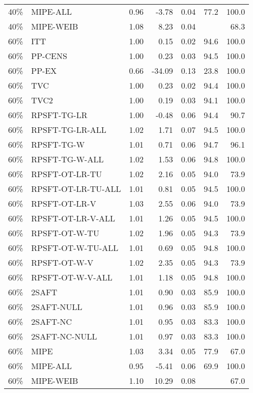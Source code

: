 \begin{table}[ht]
{\begin{tabular}{llrrrrr}
  40\% & MIPE-ALL & 0.96 & -3.78 & 0.04 & 77.2 & 100.0 \\ 
  40\% & MIPE-WEIB & 1.08 & 8.23 & 0.04 &  & 68.3 \\ 
   \hline
60\% & ITT & 1.00 & 0.15 & 0.02 & 94.6 & 100.0 \\ 
  60\% & PP-CENS & 1.00 & 0.23 & 0.03 & 94.5 & 100.0 \\ 
  60\% & PP-EX & 0.66 & -34.09 & 0.13 & 23.8 & 100.0 \\ 
  60\% & TVC & 1.00 & 0.23 & 0.02 & 94.4 & 100.0 \\ 
  60\% & TVC2 & 1.00 & 0.19 & 0.03 & 94.1 & 100.0 \\ 
   \hline
60\% & RPSFT-TG-LR & 1.00 & -0.48 & 0.06 & 94.4 & 90.7 \\ 
  60\% & RPSFT-TG-LR-ALL & 1.02 & 1.71 & 0.07 & 94.5 & 100.0 \\ 
  60\% & RPSFT-TG-W & 1.01 & 0.71 & 0.06 & 94.7 & 96.1 \\ 
  60\% & RPSFT-TG-W-ALL & 1.02 & 1.53 & 0.06 & 94.8 & 100.0 \\ 
  60\% & RPSFT-OT-LR-TU & 1.02 & 2.16 & 0.05 & 94.0 & 73.9 \\ 
  60\% & RPSFT-OT-LR-TU-ALL & 1.01 & 0.81 & 0.05 & 94.5 & 100.0 \\ 
  60\% & RPSFT-OT-LR-V & 1.03 & 2.55 & 0.06 & 94.0 & 73.9 \\ 
  60\% & RPSFT-OT-LR-V-ALL & 1.01 & 1.26 & 0.05 & 94.5 & 100.0 \\ 
   \hline
60\% & RPSFT-OT-W-TU & 1.02 & 1.96 & 0.05 & 94.3 & 73.9 \\ 
  60\% & RPSFT-OT-W-TU-ALL & 1.01 & 0.69 & 0.05 & 94.8 & 100.0 \\ 
  60\% & RPSFT-OT-W-V & 1.02 & 2.35 & 0.05 & 94.3 & 73.9 \\ 
  60\% & RPSFT-OT-W-V-ALL & 1.01 & 1.18 & 0.05 & 94.8 & 100.0 \\ 
   \hline
60\% & 2SAFT & 1.01 & 0.90 & 0.03 & 85.9 & 100.0 \\ 
  60\% & 2SAFT-NULL & 1.01 & 0.96 & 0.03 & 85.9 & 100.0 \\ 
  60\% & 2SAFT-NC & 1.01 & 0.95 & 0.03 & 83.3 & 100.0 \\ 
  60\% & 2SAFT-NC-NULL & 1.01 & 0.97 & 0.03 & 83.3 & 100.0 \\ 
  60\% & MIPE & 1.03 & 3.34 & 0.05 & 77.9 & 67.0 \\ 
  60\% & MIPE-ALL & 0.95 & -5.41 & 0.06 & 69.9 & 100.0 \\ 
  60\% & MIPE-WEIB & 1.10 & 10.29 & 0.08 &  & 67.0 \\ 
   \hline
\end{tabular}
}
\end{table}
